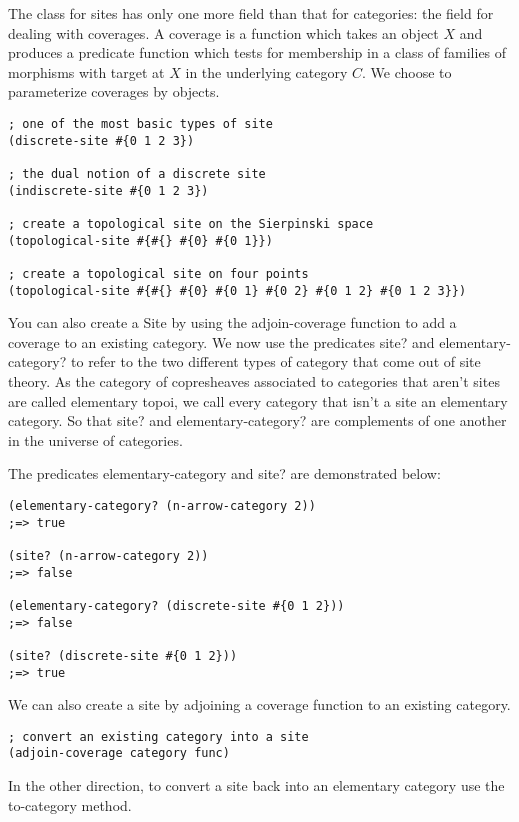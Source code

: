 \documentclass[a4paper,11pt]{report}
\begin{document}
The class for sites has only one more field than that for categories: the field for dealing with coverages. A coverage is a function which takes an object $X$ and produces a predicate function which tests for membership in a class of families of morphisms with target at $X$ in the underlying category $C$. We choose to parameterize coverages by objects.

\begin{lstlisting}
; one of the most basic types of site
(discrete-site #{0 1 2 3})

; the dual notion of a discrete site
(indiscrete-site #{0 1 2 3})

; create a topological site on the Sierpinski space
(topological-site #{#{} #{0} #{0 1}})

; create a topological site on four points
(topological-site #{#{} #{0} #{0 1} #{0 2} #{0 1 2} #{0 1 2 3}})
\end{lstlisting}

You can also create a Site by using the adjoin-coverage function to add a coverage to an existing category. We now use the predicates site? and elementary-category? to refer to the two different types of category that come out of site theory. As the category of copresheaves associated to categories that aren't sites are called elementary topoi, we call every category that isn't a site an elementary category. So that site? and elementary-category? are complements of one another in the universe of categories.

\newpage 

The predicates elementary-category and site? are demonstrated below:

\begin{lstlisting}
(elementary-category? (n-arrow-category 2))
;=> true

(site? (n-arrow-category 2))
;=> false

(elementary-category? (discrete-site #{0 1 2}))
;=> false 

(site? (discrete-site #{0 1 2}))
;=> true
\end{lstlisting}

We can also create a site by adjoining a coverage function to an existing category.

\begin{lstlisting}
; convert an existing category into a site
(adjoin-coverage category func)
\end{lstlisting}

In the other direction, to convert a site back into an elementary category use the to-category method.
\end{document}
